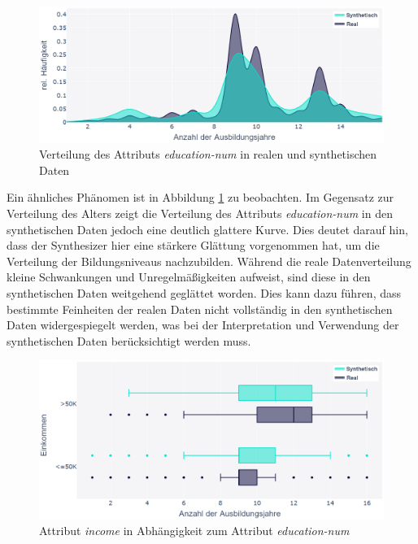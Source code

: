 \begin{spacing}{1.5}
\begin{figure}[ht]
\begin{center}
\includegraphics[width=\textwidth]{img/real-vs-synthetic-education.png}
\caption[Verteilung des Attributs \textit{education-num} in realen und synthetischen Daten]{Verteilung des Attributs \textit{education-num} in realen und synthetischen Daten}
\label{fig:real-vs-synthetic-education}
\end{center}
\end{figure}

Ein ähnliches Phänomen ist in Abbildung \ref{fig:real-vs-synthetic-education} zu beobachten. Im Gegensatz zur Verteilung des Alters zeigt die Verteilung des Attributs \textit{education-num} in den synthetischen Daten jedoch eine deutlich glattere Kurve. Dies deutet darauf hin, dass der Synthesizer hier eine stärkere Glättung vorgenommen hat, um die Verteilung der Bildungsniveaus nachzubilden. Während die reale Datenverteilung kleine Schwankungen und Unregelmäßigkeiten aufweist, sind diese in den synthetischen Daten weitgehend geglättet worden. Dies kann dazu führen, dass bestimmte Feinheiten der realen Daten nicht vollständig in den synthetischen Daten widergespiegelt werden, was bei der Interpretation und Verwendung der synthetischen Daten berücksichtigt werden muss.

\begin{figure}[ht]
\begin{center}
\includegraphics[width=\textwidth]{img/income-vs-education.png}
\caption[Attribut \textit{income} in Abhängigkeit zum Attribut \textit{education-num}]{Attribut \textit{income} in Abhängigkeit zum Attribut \textit{education-num}}
\label{fig:income-vs-education}
\end{center}
\end{figure}


\end{spacing}
